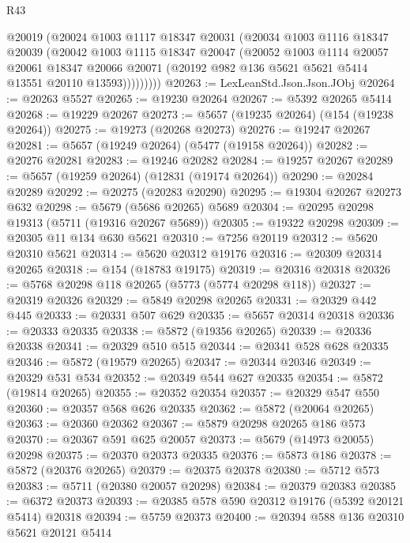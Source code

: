 \begin{lexlean}{R43}
\begin{coremodule}
            @20019
            (@20024
              @1003
              @1117
              @18347
              @20031
              (@20034
                @1003
                @1116
                @18347
                @20039
                (@20042
                  @1003
                  @1115
                  @18347
                  @20047
                  (@20052
                    @1003
                    @1114
                    @20057
                    @20061
                    @18347
                    @20066
                    @20071
                    (@20192 @982 @136 @5621 @5621 @5414 @13551 @20110 @13593)))))))))
@20263 := LexLeanStd.Json.Json.JObj
@20264 := @20263 @5527
@20265 := @19230 @20264
@20267 := @5392 @20265 @5414
@20268 := @19229 @20267
@20273 := @5657 (@19235 @20264) (@154 (@19238 @20264))
@20275 := @19273 (@20268 @20273)
@20276 := @19247 @20267
@20281 := @5657 (@19249 @20264) (@5477 (@19158 @20264))
@20282 := @20276 @20281
@20283 := @19246 @20282
@20284 := @19257 @20267
@20289 := @5657 (@19259 @20264) (@12831 (@19174 @20264))
@20290 := @20284 @20289
@20292 := @20275 (@20283 @20290)
@20295 := @19304 @20267 @20273 @632
@20298 := @5679 (@5686 @20265) @5689
@20304 := @20295 @20298 @19313 (@5711 (@19316 @20267 @5689))
@20305 := @19322 @20298
@20309 := @20305 @11 @134 @630 @5621
@20310 := @7256 @20119
@20312 := @5620 @20310 @5621
@20314 := @5620 @20312 @19176
@20316 := @20309 @20314 @20265
@20318 := @154 (@18783 @19175)
@20319 := @20316 @20318
@20326 := @5768 @20298 @118 @20265 (@5773 (@5774 @20298 @118))
@20327 := @20319 @20326
@20329 := @5849 @20298 @20265
@20331 := @20329 @442 @445
@20333 := @20331 @507 @629
@20335 := @5657 @20314 @20318
@20336 := @20333 @20335
@20338 := @5872 (@19356 @20265)
@20339 := @20336 @20338
@20341 := @20329 @510 @515
@20344 := @20341 @528 @628 @20335
@20346 := @5872 (@19579 @20265)
@20347 := @20344 @20346
@20349 := @20329 @531 @534
@20352 := @20349 @544 @627 @20335
@20354 := @5872 (@19814 @20265)
@20355 := @20352 @20354
@20357 := @20329 @547 @550
@20360 := @20357 @568 @626 @20335
@20362 := @5872 (@20064 @20265)
@20363 := @20360 @20362
@20367 := @5879 @20298 @20265 @186 @573
@20370 := @20367 @591 @625 @20057
@20373 := @5679 (@14973 @20055) @20298
@20375 := @20370 @20373 @20335
@20376 := @5873 @186
@20378 := @5872 (@20376 @20265)
@20379 := @20375 @20378
@20380 := @5712 @573
@20383 := @5711 (@20380 @20057 @20298)
@20384 := @20379 @20383
@20385 := @6372 @20373
@20393 := @20385 @578 @590 @20312 @19176 (@5392 @20121 @5414) @20318
@20394 := @5759 @20373
@20400 := @20394 @588 @136 @20310 @5621 @20121 @5414

\end{coremodule}
\end{lexlean}
